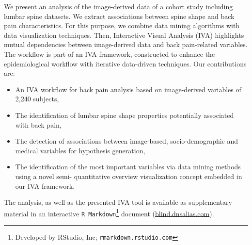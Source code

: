 \documentclass[a4paper,twoside]{style/article}
\begin{document}
We present an analysis of the image-derived data of a cohort study including lumbar spine datasets.
We extract associations between spine shape and back pain characteristics.
For this purpose, we combine data mining algorithms with data visualization techniques.
Then, Interactive Visual Analysis (IVA) highlights mutual dependencies between image-derived data and back pain-related variables.
The workflow is part of an IVA framework, constructed to enhance the epidemiological workflow with iterative data-driven techniques.
Our contributions are:
\begin{itemize}
\item An IVA workflow for back pain analysis based on image-derived variables of 2,240 subjects,
\item The identification of lumbar spine shape properties potentially associated with back pain,
\item The detection of associations between image-based, socio-demographic and medical variables for hypothesis generation,
\item The identification of the most important variables via data mining methods using a novel semi- quantitative overview visualization concept embedded in our IVA-framework.
\end{itemize}
The analysis, as well as the presented IVA tool is available as supplementary material in an interactive \texttt{R Markdown}\footnote{Developed by RStudio, Inc; \texttt{rmarkdown.rstudio.com}} document (\url{blind.dnsalias.com}).
\end{document}
